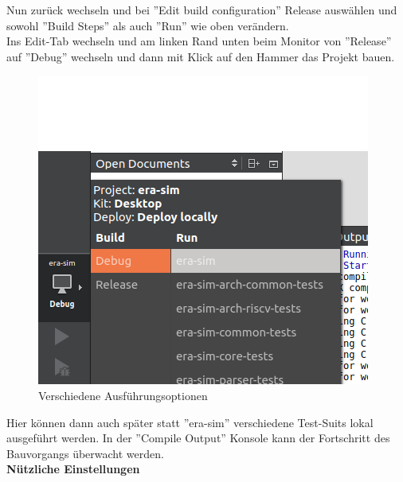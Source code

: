 Nun zurück wechseln und bei ''Edit build configuration'' Release auswählen und
sowohl ''Build Steps'' als auch ''Run'' wie oben verändern.\\

Ins Edit-Tab wechseln und am linken Rand unten beim Monitor von ''Release'' auf
''Debug'' wechseln und dann mit Klick auf den Hammer das Projekt bauen.\\
\begin{figure}[H]
	\centering
	\includegraphics[scale=0.7]{images/setup-qtcreator-change-buildrun-flavor.png}
	\caption{Verschiedene Ausführungsoptionen}
\end{figure}
Hier können dann auch später statt ''era-sim'' verschiedene Test-Suits lokal
ausgeführt werden. In der ''Compile Output'' Konsole kann der Fortschritt des
Bauvorgangs überwacht werden.\\


\textbf{Nützliche Einstellungen}

